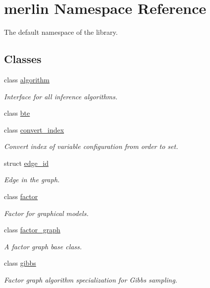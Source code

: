 \hypertarget{namespacemerlin}{}\section{merlin Namespace Reference}
\label{namespacemerlin}


The default namespace of the library.  


\subsection*{Classes}
\begin{DoxyCompactItemize}
\item 
class \hyperlink{classmerlin_1_1algorithm}{algorithm}
\begin{DoxyCompactList}\small\item\em Interface for all inference algorithms. \end{DoxyCompactList}\item 
class \hyperlink{classmerlin_1_1bte}{bte}
\item 
class \hyperlink{classmerlin_1_1convert__index}{convert\+\_\+index}
\begin{DoxyCompactList}\small\item\em Convert index of variable configuration from order to set. \end{DoxyCompactList}\item 
struct \hyperlink{structmerlin_1_1edge__id}{edge\+\_\+id}
\begin{DoxyCompactList}\small\item\em Edge in the graph. \end{DoxyCompactList}\item 
class \hyperlink{classmerlin_1_1factor}{factor}
\begin{DoxyCompactList}\small\item\em Factor for graphical models. \end{DoxyCompactList}\item 
class \hyperlink{classmerlin_1_1factor__graph}{factor\+\_\+graph}
\begin{DoxyCompactList}\small\item\em A factor graph base class. \end{DoxyCompactList}\item 
class \hyperlink{classmerlin_1_1gibbs}{gibbs}
\begin{DoxyCompactList}\small\item\em Factor graph algorithm specialization for Gibbs sampling. \end{DoxyCompactList}\item 

\end{DoxyCompactItemize}
